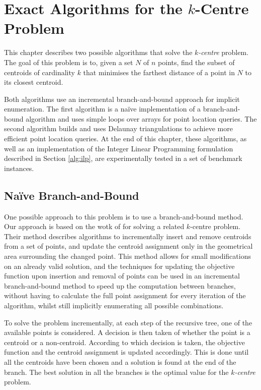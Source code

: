 \cleardoublepage
\chapter{Exact Algorithms for the $k$-Centre Problem}
\label{chap:algos}

This chapter describes two possible algorithms that solve the \emph{$k$-centre} problem. The goal of this problem is to, given a set $N$ of $n$ points, find the subset of centroids of cardinality $k$ that minimises the farthest distance of a point in $N$ to its closest centroid. 

Both algorithms use an incremental branch-and-bound approach for implicit enumeration. The first algorithm is a naïve implementation of a branch-and-bound algorithm and uses simple loops over arrays for point location queries. The second algorithm builds and uses Delaunay triangulations to achieve more efficient point location queries. At the end of this chapter, these algorithms, as well as an implementation of the Integer Linear Programming formulation described in Section \ref{alg:ilp}, are experimentally tested in a set of benchmark instances.

\section{Naïve Branch-and-Bound}
\label{alg:bb}

One possible approach to this problem is to use a branch-and-bound method. Our approach is based on the wotk of \citet{incrementalcov} for solving a related $k$-centre problem. Their method describes algorithms to incrementally insert and remove centroids from a set of points, and update the centroid assignment only in the geometrical area surrounding the changed point. This method allows for small modifications on an already valid solution, and the techniques for updating the objective function upon insertion and removal of points can be used in an incremental branch-and-bound method to speed up the computation between branches, without having to calculate the full point assignment for every iteration of the algorithm, whilst still implicitly enumerating all possible combinations. 

To solve the problem incrementally, at each step of the recursive tree, one of the available points is considered. A decision is then taken of whether the point is a centroid or a non-centroid. According to which decision is taken, the objective function and the centroid assignment is updated accordingly. This is done until all the centroids have been chosen and a solution is found at the end of the branch. The best solution in all the branches is the optimal value for the \emph{$k$-centre} problem.

